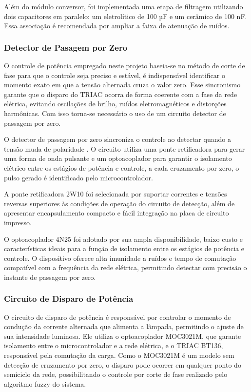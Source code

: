 Além do módulo conversor, foi implementada uma etapa de filtragem utilizando dois capacitores em paralelo: um eletrolítico de 100 µF e um cerâmico de 100 nF. Essa associação é recomendada por ampliar a faixa de atenuação de ruídos. \cite{TexasInstr630}

\subsubsection{Detector de Pasagem por Zero}

O controle de potência empregado neste projeto baseia-se no método de corte de fase
para que o controle seja preciso e estável, é indispensável identificar o momento exato em que a tensão alternada cruza o valor zero. Esse sincronismo garante que o disparo do TRIAC ocorra de forma coerente com a fase da rede elétrica, evitando oscilações de brilho, ruídos eletromagnéticos e distorções harmônicas. Com isso torna-se necessário o uso de um circuito detector de passagem por zero.

O detector de passagem por zero sincroniza o controle ao detectar quando a tensão muda de polaridade \cite{Vieira2024}. O circuito utiliza uma ponte retificadora para gerar uma forma de onda pulsante e um optoacoplador para garantir o isolamento elétrico entre os estágios de potência e controle, a cada cruzamento por zero, o pulso gerado é identificado pelo microcontrolador.

A ponte retificadora 2W10 foi selecionada por suportar correntes e tensões reversas superiores às condições de operação do circuito de detecção, além de apresentar encapsulamento compacto e fácil integração na placa de circuito impresso.

O optoacoplador 4N25 foi adotado por sua ampla disponibilidade, baixo custo e características ideais para a função de isolamento entre os estágios de potência e controle. O dispositivo oferece alta imunidade a ruídos e tempo de comutação compatível com a frequência da rede elétrica, permitindo detectar com precisão o instante de passagem por zero.

\subsubsection{Circuito de Disparo de Potência}

O circuito de disparo de potência é responsável por controlar o momento de condução da corrente alternada que alimenta a lâmpada, permitindo o ajuste de sua intensidade luminosa. Ele utiliza o optoacoplador MOC3021M, que garante isolamento entre o microcontrolador e a rede elétrica, e o TRIAC BT136, responsável pela comutação da carga. Como o MOC3021M é um modelo sem detecção de cruzamento por zero, o disparo pode ocorrer em qualquer ponto do semiciclo da rede, possibilitando o controle por corte de fase realizado pelo algoritmo fuzzy do sistema.

